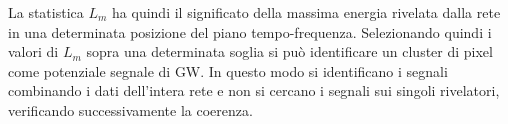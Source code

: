 La statistica $L_m$ ha quindi il significato della massima energia rivelata dalla rete in una determinata posizione del piano tempo-frequenza. Selezionando quindi i valori di $L_m$ sopra una determinata soglia si può identificare un cluster di pixel come potenziale segnale di GW. In questo modo si identificano i segnali combinando i dati dell'intera rete e non si cercano i segnali sui singoli rivelatori, verificando successivamente la coerenza.
